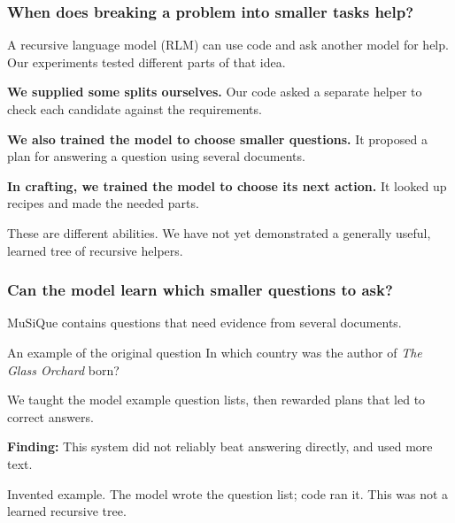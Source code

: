 \documentclass[aspectratio=169,12pt]{beamer}
\newcommand{\aside}[1]{\vfill{\footnotesize\color{Gray}#1\par}}
\begin{document}
\begin{frame}[t]
\frametitle{When does breaking a problem into smaller tasks help?}
A recursive language model (RLM) can use code and ask another model for help. Our experiments tested different parts of that idea.
\medskip

\textbf{We supplied some splits ourselves.} Our code asked a separate helper to check each candidate against the requirements.
\medskip

\textbf{We also trained the model to choose smaller questions.} It proposed a plan for answering a question using several documents.
\medskip

\textbf{In crafting, we trained the model to choose its next action.} It looked up recipes and made the needed parts.
\aside{These are different abilities. We have not yet demonstrated a generally useful, learned tree of recursive helpers.}
\end{frame}

\begin{frame}[t]
\frametitle{Can the model learn which smaller questions to ask?}
MuSiQue contains questions that need evidence from several documents.
\begin{block}{An example of the original question}
In which country was the author of \textit{The Glass Orchard} born?
\end{block}
\vspace{1mm}
\begin{center}
\end{center}
We taught the model example question lists, then rewarded plans that led to correct answers.
\medskip

\textbf{Finding:} This system did not reliably beat answering directly, and used more text.
\aside{Invented example. The model wrote the question list; code ran it. This was not a learned recursive tree.}
\end{frame}
\end{document}

